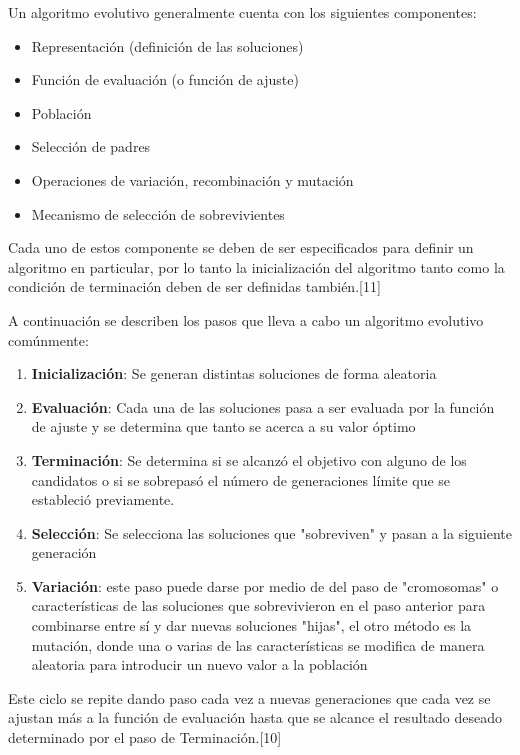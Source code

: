 Un algoritmo evolutivo generalmente cuenta con los siguientes componentes:

\begin{itemize}
\item Representación (definición de las soluciones)
\item Función de evaluación (o función de ajuste)
\item Población
\item Selección de padres
\item Operaciones de variación, recombinación y mutación
\item Mecanismo de selección de sobrevivientes 
\end{itemize}


Cada uno de estos componente se deben de ser especificados para definir un algoritmo en particular, por lo tanto la inicialización del algoritmo tanto como la condición de terminación deben de ser definidas también.[11]

A continuación se describen los pasos que lleva a cabo un algoritmo evolutivo comúnmente:

\begin{enumerate}
\item \textbf{Inicialización}: Se generan distintas soluciones de forma aleatoria
\item \textbf{Evaluación}: Cada una de las soluciones pasa a ser evaluada por la función de ajuste y se determina que tanto se acerca a su valor óptimo
\item \textbf{Terminación}: Se determina si se alcanzó el objetivo con alguno de los candidatos o si se sobrepasó el número de generaciones límite que se estableció previamente.
\item \textbf{Selección}: Se selecciona las soluciones que "sobreviven" y pasan a la siguiente generación
\item \textbf{Variación}: este paso puede darse por medio de del paso de "cromosomas" o características de las soluciones que sobrevivieron en el paso anterior para combinarse entre sí y dar nuevas soluciones "hijas", el otro método es la mutación, donde una o varias de las características se modifica de manera aleatoria para introducir un nuevo valor a la población
\end{enumerate}


Este ciclo se repite dando paso cada vez a nuevas generaciones que cada vez se ajustan más a la función de evaluación hasta que se alcance el resultado deseado determinado por el paso de Terminación.[10] \\

